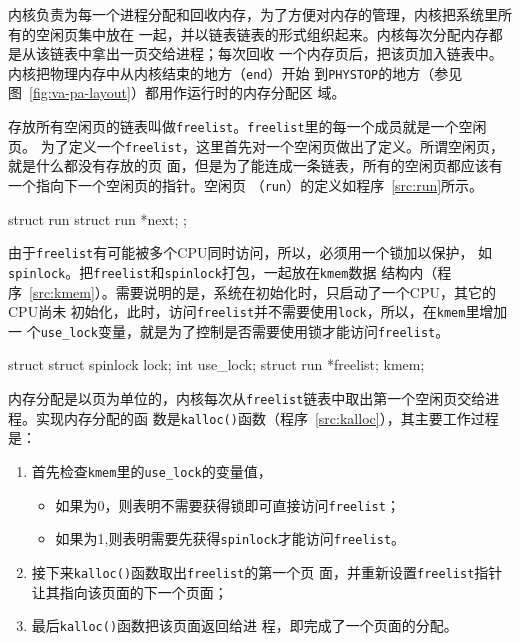 \documentclass{swfuthesism}
\begin{document}
内核负责为每一个进程分配和回收内存，为了方便对内存的管理，内核把系统里所有的空闲页集中放在
一起，并以链表链表的形式组织起来。内核每次分配内存都是从该链表中拿出一页交给进程；每次回收
一个内存页后，把该页加入链表中。内核把物理内存中从内核结束的地方（\texttt{end}）开始
到\texttt{PHYSTOP}的地方（参见图~\ref{fig:va-pa-layout}）都用作运行时的内存分配区
域。

存放所有空闲页的链表叫做\texttt{freelist}。\texttt{freelist}里的每一个成员就是一个空闲页。
为了定义一个\texttt{freelist}，这里首先对一个空闲页做出了定义。所谓空闲页，就是什么都没有存放的页
面，但是为了能连成一条链表，所有的空闲页都应该有一个指向下一个空闲页的指针。空闲页
（\texttt{run}）的定义如程序~\ref{src:run}所示。

\begin{listing}%
  \begin{codeblock}
\begin{ccode}
struct run {
  struct run *next;
};
\end{ccode}    
  \end{codeblock}
  \label{src:run}
\end{listing}

由于\texttt{freelist}有可能被多个CPU同时访问，所以，必须用一个锁加以保护，
如\texttt{spinlock}。把\texttt{freelist}和\texttt{spinlock}打包，一起放在\texttt{kmem}数据
结构内（程序~\ref{src:kmem}）。需要说明的是，系统在初始化时，只启动了一个CPU，其它的CPU尚未
初始化，此时，访问\texttt{freelist}并不需要使用\texttt{lock}，所以，在\texttt{kmem}里增加一
个\texttt{use\_lock}变量，就是为了控制是否需要使用锁才能访问\texttt{freelist}。

\begin{listing}%
  \begin{codeblock}
\begin{ccode}
struct {
  struct spinlock lock;
  int use_lock;
  struct run *freelist;
} kmem;
\end{ccode}    
  \end{codeblock}
  \label{src:kmem}
\end{listing}

内存分配是以页为单位的，内核每次从\texttt{freelist}链表中取出第一个空闲页交给进程。实现内存分配的函
数是\texttt{kalloc()}函数（程序~\ref{src:kalloc}），其主要工作过程是：
\begin{enumerate}
\item 首先检查\texttt{kmem}里的\texttt{use\_lock}的变量值，
  \begin{itemize}
  \item 如果为0，则表明不需要获得锁即可直接访问\texttt{freelist}；
  \item 如果为1,则表明需要先获得\texttt{spinlock}才能访问\texttt{freelist}。
  \end{itemize}
\item 接下来\texttt{kalloc()}函数取出\texttt{freelist}的第一个页
  面，并重新设置\texttt{freelist}指针让其指向该页面的下一个页面；
\item 最后\texttt{kalloc()}函数把该页面返回给进
  程，即完成了一个页面的分配。
\end{enumerate}
\end{document}
